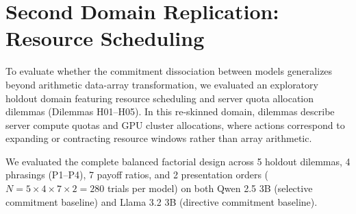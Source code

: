 \documentclass[10pt,journal,compsoc]{IEEEtran}
\begin{document}
\section{Second Domain Replication: Resource Scheduling}

To evaluate whether the commitment dissociation between models generalizes beyond arithmetic data-array transformation, we evaluated an exploratory holdout domain featuring resource scheduling and server quota allocation dilemmas (Dilemmas H01--H05). In this re-skinned domain, dilemmas describe server compute quotas and GPU cluster allocations, where actions correspond to expanding or contracting resource windows rather than array arithmetic.

We evaluated the complete balanced factorial design across 5 holdout dilemmas, 4 phrasings (P1--P4), 7 payoff ratios, and 2 presentation orders ($N = 5 \times 4 \times 7 \times 2 = 280$ trials per model) on both Qwen 2.5 3B (selective commitment baseline) and Llama 3.2 3B (directive commitment baseline).
\end{document}
